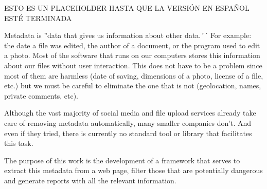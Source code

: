 ESTO ES UN PLACEHOLDER HASTA QUE LA VERSIÓN EN ESPAÑOL ESTÉ TERMINADA

Metadata is ''data that gives us information about other data.´´ For example: the date a file was edited, the author of a document, or the program used to edit a photo. Most of the software that runs on our computers stores this information about our files without user interaction. This does not have to be a problem since most of them are harmless (date of saving, dimensions of a photo, license of a file, etc.) but we must be careful to eliminate the one that is not (geolocation, names, private comments, etc).

Although the vast majority of social media and file upload services already take care of removing metadata automatically, many smaller companies don't. And even if they tried, there is currently no standard tool or library that facilitates this task.

The purpose of this work is the development of a framework that serves to extract this metadata from a web page, filter those that are potentially dangerous and generate reports with all the relevant information.

